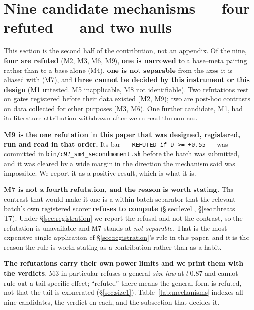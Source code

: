 \documentclass[10pt,letterpaper]{article}
\begin{document}
\section{Nine candidate mechanisms --- four refuted --- and two nulls}
\label{sec:mechanisms}

This section is the second half of the contribution, not an appendix. Of the nine, \textbf{four
are refuted} (M2, M3, M6, M9), \textbf{one is narrowed} to a base--meta pairing rather than to a
base alone (M4),
\textbf{one is not separable} from the axes it is aliased with (M7), and \textbf{three cannot be
decided by this instrument or this design} (M1 untested, M5 inapplicable, M8 not identifiable).
Two refutations rest on gates registered before their data existed (M2, M9); two are post-hoc
contrasts on data collected for other purposes (M3, M6). One further candidate, M1, had its
literature attribution withdrawn after we re-read the sources.

\textbf{M9 is the one refutation in this paper that was designed, registered, run and read in that
order.} Its bar --- \texttt{REFUTED if D >= +0.55} --- was committed in
\texttt{bin/c97\_sm4\_secondmoment.sh} before the batch was submitted, and it was cleared by a
wide margin in the direction the mechanism said was impossible. We report it as a positive result,
which is what it is.

\textbf{M7 is not a fourth refutation, and the reason is worth stating.} The contrast that would
make it one is a within-batch separator that the relevant batch's own registered scorer
\textbf{refuses to compute} (\S\ref{sec:level}, \S\ref{sec:threats} T7). Under
\S\ref{sec:registration} we report the refusal and not the contrast, so the refutation is
unavailable and M7 stands at \emph{not separable}. That is the most expensive single application
of \S\ref{sec:registration}'s rule in this
paper, and it is the reason the rule is worth stating as a contribution rather than as a habit.

\textbf{The refutations carry their own power limits and we print them with the verdicts.} M3 in
particular refuses a general \emph{size law} at $t\ 0.87$ and cannot rule out a tail-specific
effect; ``refuted'' there means the general form is refuted, not that the tail is exonerated
(\S\ref{sec:size1}). Table~\ref{tab:mechanisms} indexes all nine candidates, the verdict on each,
and the subsection that decides it.
\end{document}
